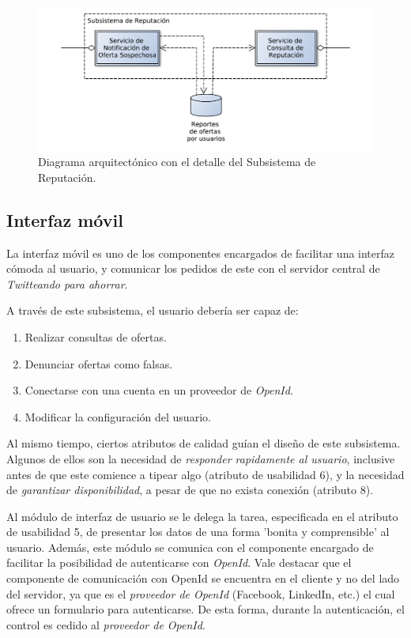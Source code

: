 \begin{figure}[H]
	\centering
	\includegraphics[width=\textwidth]{graficos/arch/subsist_reputacion.pdf}
	\caption{Diagrama arquitectónico con el detalle del \textsf{Subsistema de Reputación}.}
\end{figure}

\subsection{Interfaz móvil}

La interfaz móvil es uno de los componentes encargados de facilitar una interfaz cómoda al usuario, y comunicar los pedidos de este con el servidor central de \emph{Twitteando para ahorrar}.

A través de este subsistema, el usuario debería ser capaz de:
\begin{enumerate}
	\item Realizar consultas de ofertas.
	\item Denunciar ofertas como falsas.
	\item Conectarse con una cuenta en un proveedor de \emph{OpenId}.
	\item Modificar la configuración del usuario.
\end{enumerate}

Al mismo tiempo, ciertos atributos de calidad guían el diseño de este subsistema. Algunos de ellos son la necesidad de \emph{responder rapidamente al usuario}, inclusive antes de que este comience a tipear algo (atributo de usabilidad 6), y la necesidad de \emph{garantizar disponibilidad}, a pesar de que no exista conexión (atributo 8).

Al módulo de interfaz de usuario se le delega la tarea, especificada en el atributo de usabilidad 5, de presentar los datos de una forma 'bonita y comprensible' al usuario. Además, este módulo se comunica con el componente encargado de facilitar la posibilidad de autenticarse con \emph{OpenId}. Vale destacar que el componente de comunicación con OpenId se encuentra en el cliente y no del lado del servidor, ya que es el \emph{proveedor de OpenId} (\textsf{Facebook}, \textsf{LinkedIn}, etc.) el cual ofrece un formulario para autenticarse. De esta forma, durante la autenticación, el control es cedido al \emph{proveedor de OpenId}.

